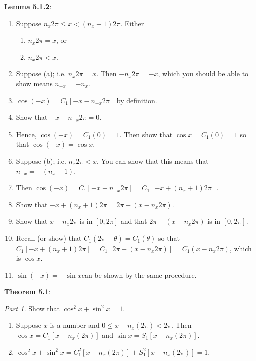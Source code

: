 \documentclass[english]{book}
\begin{document}
\textbf{Lemma 5.1.2}:
\begin{enumerate}[\hspace{1cm}1)]
  \item Suppose $n_{x}2\pi \leq x < (n_{x}+1)2\pi$. Either
    \begin{enumerate}[\hspace{1cm}a)]
      \item $n_{x}2\pi = x$, or
      \item $n_{x}2\pi < x$.
    \end{enumerate}
  \item Suppose (a); i.e. $n_{x}2\pi = x$. Then $-n_{x}2\pi = -x$, which you should be able to show means $n_{-x} = -n_{x}$.
  \item $\cos(-x) = C_{1}[-x-n_{-x}2\pi]$ by definition.
  \item Show that $-x-n_{-x}2\pi = 0$.
  \item Hence, $\cos(-x) = C_{1}(0) = 1$. Then show that $\cos x = C_{1}(0) = 1$ so that $\cos(-x) = \cos x$.
  \item Suppose (b); i.e. $n_{x}2\pi < x$. You can show that this means that $n_{-x} = -(n_{x}+1)$.
  \item Then $\cos(-x) = C_{1}[-x-n_{-x}2\pi] = C_{1}[-x+(n_{x}+1)2\pi]$.
  \item Show that $-x+(n_{x}+1)2\pi = 2\pi-(x-n_{x}2\pi)$.
  \item Show that $x-n_{x}2\pi$ is in $[0,2\pi]$ and that $2\pi-(x-n_{x}2\pi)$ is in $[0,2\pi]$.
  \item Recall (or show) that $C_{1}(2\pi-\theta) = C_{1}(\theta)$ so that $C_{1}[-x+(n_{x}+1)2\pi] = C_{1}[2\pi-(x-n_{x}2\pi)] = C_{1}(x-n_{x}2\pi)$, which is $\cos x$.
  \item $\sin(-x) = -\sin x$can be shown by the same procedure.
\end{enumerate}

\textbf{Theorem 5.1}:

\emph{Part 1.} Show that $\cos^{2}x + \sin^{2}x = 1$.
\begin{enumerate}[\hspace{1cm}1)]
  \item Suppose $x$ is a number and $0 \leq x-n_{x}(2\pi) < 2\pi$. Then $\cos x = C_{1}[x-n_{x}(2\pi)]$ and $\sin x = S_{1}[x-n_{x}(2\pi)]$.
  \item $\cos^{2}x + \sin^{2}x = C_{1}^{2}[x-n_{x}(2\pi)] + S_{1}^{2}[x-n_{x}(2\pi)] = 1$.
\end{enumerate}
\end{document}
